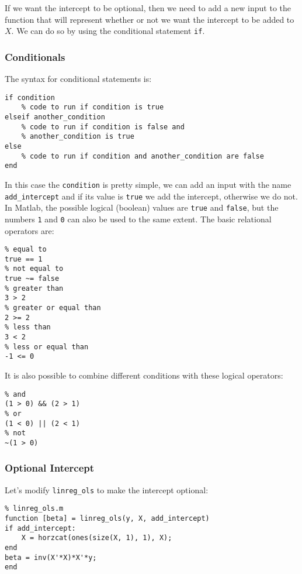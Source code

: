\documentclass[12pt, a4paper]{article}
\begin{document}
If we want the intercept to be optional, then we need to add a new input to the function that will represent whether or not we want the intercept to be added to \(X\).
We can do so by using the conditional statement \texttt{if}.
\subsubsection{Conditionals}
\label{sec:org98d0d16}
The syntax for conditional statements is:
\lstset{language=matlab,label= ,caption= ,captionpos=b,firstnumber=1,numbers=left,style=Matlab-editor}
\begin{lstlisting}
if condition
    % code to run if condition is true
elseif another_condition
    % code to run if condition is false and
    % another_condition is true
else
    % code to run if condition and another_condition are false
end
\end{lstlisting}

In this case the \texttt{condition} is pretty simple, we can add an input with the name \texttt{add\_intercept} and if its value is \texttt{true} we add the intercept, otherwise we do not.
In Matlab, the possible logical (boolean) values are \texttt{true} and \texttt{false}, but the numbers \texttt{1} and \texttt{0} can also be used to the same extent.
The basic relational operators are:
\lstset{language=matlab,label= ,caption= ,captionpos=b,firstnumber=1,numbers=left,style=Matlab-editor}
\begin{lstlisting}
% equal to
true == 1
% not equal to
true ~= false
% greater than
3 > 2
% greater or equal than
2 >= 2
% less than
3 < 2
% less or equal than
-1 <= 0
\end{lstlisting}

It is also possible to combine different conditions with these logical operators:
\lstset{language=matlab,label= ,caption= ,captionpos=b,firstnumber=1,numbers=left,style=Matlab-editor}
\begin{lstlisting}
% and
(1 > 0) && (2 > 1)
% or
(1 < 0) || (2 < 1)
% not
~(1 > 0)
\end{lstlisting}
\subsubsection{Optional Intercept}
\label{sec:orgfc351d1}
Let's modify \texttt{linreg\_ols} to make the intercept optional:
\lstset{language=matlab,label= ,caption= ,captionpos=b,firstnumber=1,numbers=left,style=Matlab-editor}
\begin{lstlisting}
% linreg_ols.m
function [beta] = linreg_ols(y, X, add_intercept)
if add_intercept:
    X = horzcat(ones(size(X, 1), 1), X);
end
beta = inv(X'*X)*X'*y;
end
\end{lstlisting}
\end{document}
